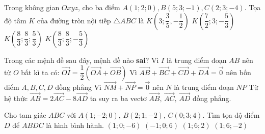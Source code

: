 \begin{ex}%
	Trong không gian $Oxyz$, cho ba điểm $A(1;2;0),B(5;3;-1),C(2;3;-4)$. Tọa độ tâm $K$ của đường tròn nội tiếp $\triangle ABC$ là
	\choice
	{ $K\left(3;\dfrac{3}{5},-\dfrac{1}{2}\right)$}
	{ $K\left(\dfrac{7}{2};3;-\dfrac{5}{3}\right)$}
	{$K\left(\dfrac{8}{3};\dfrac{8}{3};\dfrac{5}{3}\right)$}
	{\True  $K\left(\dfrac{8}{3};\dfrac{8}{3};-\dfrac{5}{3}\right)$}
\end{ex}

\begin{ex}%
	Trong các mệnh đề sau đây, mệnh đề nào \textbf{sai}?
	\choice
	{Vì $I$ là trung điểm đoạn $AB$ nên từ $O$ bất kì ta có: $\overrightarrow{OI}=\dfrac{1}{2}( \overrightarrow{OA}+\overrightarrow{OB} )$}
	{\True Vì $\overrightarrow{AB}+\overrightarrow{BC}+\overrightarrow{CD}+\overrightarrow{DA}=\overrightarrow{0}$ nên bốn điểm $A,B,C,D$ đồng phẳng}
	{Vì $\overrightarrow{NM}+\overrightarrow{NP}=\overrightarrow{0}$ nên $N$ là trung điểm đoạn $NP$}
	{Từ hệ thức $\overrightarrow{AB}=2\overrightarrow{AC}-8\overrightarrow{AD}$ ta suy ra ba vectơ $\overrightarrow{AB},\,\overrightarrow{AC},\,\overrightarrow{AD}$ đồng phẳng.
	}
\end{ex}

\begin{ex}%
	Cho tam giác $ABC$ với $A(1;-2;0)$, $B(2;1;-2)$, $C(0;3;4)$. Tìm tọa độ điểm $D$ để $ABDC$ là hình bình hành.
	\choice
	{$(1;0;-6)$}
	{$(-1;0;6)$}
	{\True $(1;6;2)$}
	{$(1;6;-2)$}
\end{ex}

